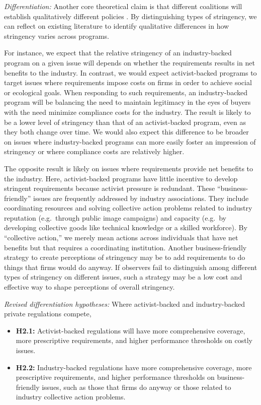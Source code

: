\documentclass[
      12pt,
            Review ]{article}
\begin{document}
\emph{Differentiation:} Another core theoretical claim is that different
coalitions will establish qualitatively different policies
\citep{Botzem2012, Hsueh2012}. By distinguishing types of stringency, we
can reflect on existing literature to identify qualitative differences
in how stringency varies across programs.

For instance, we expect that the relative stringency of an
industry-backed program on a given issue will depends on whether the
requirements results in net benefits to the industry. In contrast, we
would expect activist-backed programs to target issues where
requirements impose costs on firms in order to achieve social or
ecological goals. When responding to such requirements, an
industry-backed program will be balancing the need to maintain
legitimacy in the eyes of buyers with the need minimize compliance costs
for the industry. The result is likely to be a lower level of stringency
than that of an activist-backed program, even as they both change over
time. We would also expect this difference to be broader on issues where
industry-backed programs can more easily foster an impression of
stringency or where compliance costs are relatively higher.

The opposite result is likely on issues where requirements provide net
benefits to the industry. Here, activist-backed programs have little
incentive to develop stringent requirements because activist pressure is
redundant. These ``business-friendly'' issues are frequently addressed
by industry associations. They include coordinating resources and
solving collective action problems related to industry reputation
(e.g.~through public image campaigns) and capacity (e.g.~by developing
collective goods like technical knowledge or a skilled workforce). By
``collective action,'' we merely mean actions across individuals that
have net benefits but that requires a coordinating institution. Another
business-friendly strategy to create perceptions of stringency may be to
add requirements to do things that firms would do anyway. If observers
fail to distinguish among different types of stringency on different
issues, such a strategy may be a low cost and effective way to shape
perceptions of overall stringency.

\emph{Revised differentiation hypotheses:} Where activist-backed and
industry-backed private regulations compete,

\begin{itemize}
\item
  \textbf{H2.1:} Activist-backed regulations will have more
  comprehensive coverage, more prescriptive requirements, and higher
  performance thresholds on costly issues.
\item
  \textbf{H2.2:} Industry-backed regulations have more comprehensive
  coverage, more prescriptive requirements, and higher performance
  thresholds on business-friendly issues, such as those that firms do
  anyway or those related to industry collective action problems.
\end{itemize}
\end{document}
